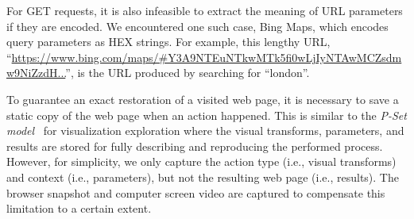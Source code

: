 For GET requests, it is also infeasible to extract the meaning of URL parameters if they are encoded. We encountered one such case, Bing Maps, which encodes query parameters as HEX strings. For example, this lengthy URL, ``\url{https://www.bing.com/maps/#Y3A9NTEuNTkwMTk5fi0wLjIyNTAwMCZsdmw9NiZzdH...}'', is the URL produced by searching for ``london''.

To guarantee an exact restoration of a visited web page, it is necessary to save a static copy of the web page when an action happened. This is similar to the \emph{P-Set model}~\cite{Jankun-Kelly2007} for visualization exploration where the visual transforms, parameters, and results are stored for fully describing and reproducing the performed process. However, for simplicity, we only capture the action type (i.e., visual transforms) and context (i.e., parameters), but not the resulting web page (i.e., results). The browser snapshot and computer screen video are captured to compensate this limitation to a certain extent.